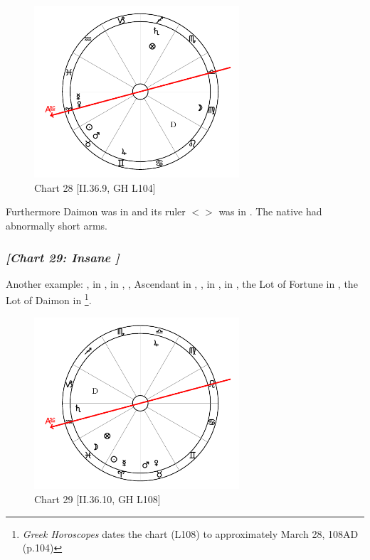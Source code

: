 \clearpage
\begin{figure}
\centering
\vspace{-20pt}
\includegraphics[width=0.68\textwidth]{charts/2_36_9}
\caption{Chart 28 [II.36.9, GH L104]}
\label{fig:chart28}
\end{figure}

Furthermore Daimon was in \Leo\xspace and its ruler $<$\Sun$>$ was in \Taurus. The native had abnormally short arms.

\newpage
\subsubsection{\textit{[Chart 29: Insane ]}}
Another example: \Sun, \Mercury\xspace in \Aries, \Moon\xspace in \Pisces, \Saturn, Ascendant in \Aquarius, \Mars, \Venus\xspace in \Taurus, \Jupiter\xspace in \Libra, the Lot of Fortune in \Pisces, the Lot of Daimon in \Capricorn
\footnote{\textit{Greek Horoscopes} dates the chart (L108) to approximately March 28, 108AD (p.104)}.

\clearpage
\begin{figure}
\centering
\vspace{-20pt}
\includegraphics[width=0.68\textwidth]{charts/2_36_10}
\caption{Chart 29 [II.36.10, GH L108]}
\label{fig:chart29}
\end{figure}


